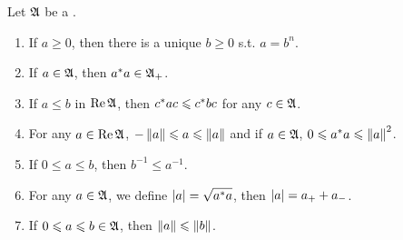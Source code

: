\documentclass[a4paper,11pt]{report}
\begin{document}
\begin{prop}
	Let $\mathfrak{A}$ be a \Cs.
	\begin{enumerate}[label=\arabic*)]
		\item If $a \geqslant 0$, then there is a unique $b \geqslant 0$ s.t. $a = b^n$.
		\item If $a \in \mathfrak{A}$, then $a^{*}a \in \mathfrak{A}_{+}$.
		\item If $a \leqslant b$ in $\operatorname{Re}{\mathfrak{A}}$, then $c^{*}ac \leqslant c^{*}bc$ for any $c \in \mathfrak{A}$.
		\item For any $a \in \operatorname{Re}{\mathfrak{A}}$, $-\left\lVert a\right\lVert \leqslant a \leqslant \left\lVert a\right\lVert$ and if $a \in \mathfrak{A}$, $0 \leqslant a^{*}a \leqslant \left\lVert a\right\lVert^2$.
		\item If $0 \leqslant a \leqslant b$, then $b^{-1} \leqslant a^{-1}$.
		\item For any $a \in \mathfrak{A}$, we define $\left\lvert a\right\lvert = \sqrt{a^{*}a}$, then $\left\lvert a\right\lvert = a_{+}+a_{-}$.
		\item If $0 \leqslant a \leqslant b \in \mathfrak{A}$, then $\left\lVert a\right\lVert \leqslant \left\lVert b\right\lVert$.
	\end{enumerate}
\end{prop}
\end{document}
